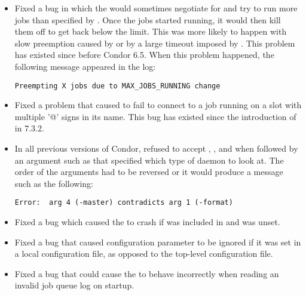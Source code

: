 \begin{itemize}

\item Fixed a bug in which the  would sometimes negotiate
  for and try to run
  more jobs than specified by .  Once the
  jobs started running, it would then kill them off to get back below
  the limit.  This was more likely to happen with slow preemption
  caused by  or by a large timeout
  imposed by .  This problem has existed since before
  Condor 6.5.  When this problem happened, the following message
  appeared in the  log:

\begin{verbatim}
Preempting X jobs due to MAX_JOBS_RUNNING change
\end{verbatim}

\item Fixed a problem that caused  to fail to connect
to a job running on a slot with multiple '@' signs in its name.  This bug
has existed since the introduction of  in 7.3.2.

\item In all previous versions of Condor,  refused to
  accept , , and  when followed by
  an argument such as  that specified which type of
  daemon to look at.  The order of the arguments had to be reversed or
  it would produce a message such as the following:

\begin{verbatim}
Error:  arg 4 (-master) contradicts arg 1 (-format)
\end{verbatim}

\item Fixed a bug which caused the  to crash if
 was included in  and
 was unset.

\item Fixed a bug that caused configuration parameter
 to be ignored if it was set in a local
configuration file, as opposed to the top-level configuration file.

\item Fixed a bug that could cause the  to behave
incorrectly when reading an invalid job queue log on startup.


\end{itemize}
